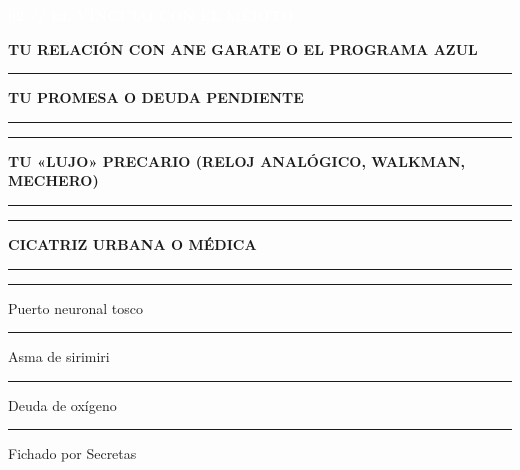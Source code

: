 \documentclass[10pt,a4paper,oneside]{book}
\newcommand{\rulefield}[2][\linewidth]{%
  \begin{minipage}[t]{#1}
  \textcolor{InkSoft}{\industrialfont\scriptsize\bfseries\MakeUppercase{#2}}\par
  \vspace{0.8mm}\textcolor{Line}{\rule{\linewidth}{0.45pt}}
  \end{minipage}}
\newcommand{\strip}[1]{%
  \vspace{0.8mm}\noindent
  \colorbox{CarbonDark}{\parbox{\dimexpr\linewidth-2\fboxsep\relax}{%
    \textcolor{white}{\industrialfont\bfseries\small\MakeUppercase{#1}}}}\par
  \vspace{0.8mm}}
\newcommand{\checkline}[2]{%
  \textcolor{#1}{\rule{2.4mm}{2.4mm}}\hspace{1mm}\textcolor{InkSoft}{\scriptsize #2}}
\begin{document}
\begin{minipage}[t]{0.48\linewidth}
  \strip{02 // El vínculo con el mérito}
  \begin{tcolorbox}[enhanced,colback=BluePale,colframe=UrdinLoteria,boxrule=.6pt,
    arc=0.8mm,left=4pt,right=4pt,top=2.5pt,bottom=2.5pt,height=44mm]
    \scriptsize
    \rulefield{Tu relación con Ane Garate o el Programa Azul}\par\vspace{1mm}
    \rulefield{Tu promesa o deuda pendiente}\par\vspace{1mm}
    \textcolor{Line}{\rule{\linewidth}{.4pt}}\par\vspace{1mm}
    \rulefield{Tu «lujo» precario (reloj analógico, walkman, mechero)}\par\vspace{1mm}
    \textcolor{Line}{\rule{\linewidth}{.4pt}}\par\vspace{1mm}
    \rulefield{Cicatriz urbana o médica}\par\vspace{1mm}
    \checkline{UrdinLoteria}{Puerto neuronal tosco}\hfill
    \checkline{UrdinLoteria}{Asma de sirimiri}\par\vspace{0.8mm}
    \checkline{UrdinLoteria}{Deuda de oxígeno}\hfill
    \checkline{UrdinLoteria}{Fichado por Secretas}
  \end{tcolorbox}
\end{minipage}\hfill
\end{document}
